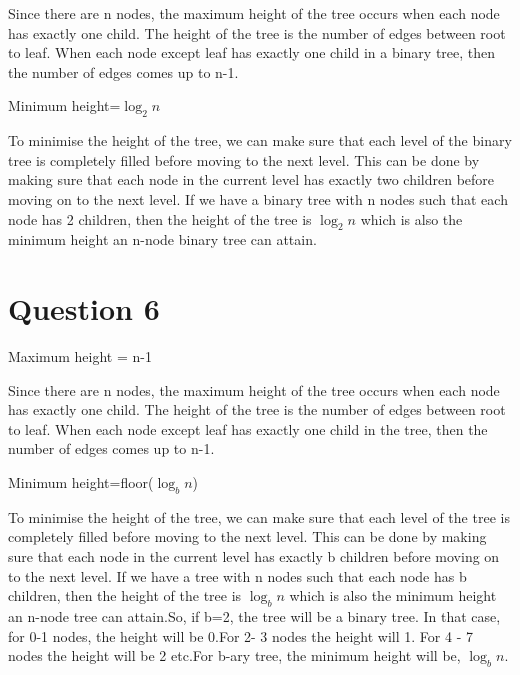 \documentclass{article}
\begin{document}
Since there are n nodes, the maximum height of the tree occurs when each node has exactly one child. The height of the tree is the number of edges 
between root to leaf. When each node except leaf has exactly one child in a binary tree, then the number of edges comes up to n-1.

Minimum height=$\log_2 n$

To minimise the height of the tree, we can make sure that each level of the binary tree is completely filled before moving to the next level.
This can be done by making sure that each node in the current level has exactly two children before moving on to the next level. If we have a binary tree with n nodes such that each node 
has 2 children, then the height of the tree is $\log_2 n$ which is also the minimum height an n-node binary tree can attain.


\section*{Question 6}

Maximum height = n-1

Since there are n nodes, the maximum height of the tree occurs when each node has exactly one child. The height of the tree is the number of edges
between root to leaf. When each node except leaf has exactly one child in the tree, then the number of edges comes up to n-1.

Minimum height=floor($\log_b n$)

To minimise the height of the tree, we can make sure that each level of the tree is completely filled before moving to the next level.
This can be done by making sure that each node in the current level has exactly b children before moving on to the next level. If we have a tree with n nodes such that each node
has b children, then the height of the tree is $\log_b n$ which is also the minimum height an n-node tree can attain.So, if b=2, the tree will be a binary tree. In that case, for 0-1 nodes,
the height will be 0.For 2- 3 nodes the height will 1. For 4 - 7 nodes the height will be 2 etc.For b-ary tree, the minimum height will be, $\log_b n$.
\end{document}
